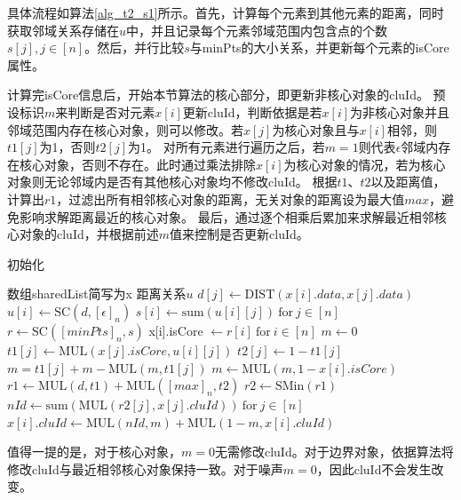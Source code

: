 具体流程如算法\ref{alg_t2_s1}所示。首先，计算每个元素到其他元素的距离，同时获取邻域关系存储在$ u $中，并且记录每个元素邻域范围内包含点的个数$ s[j],j\in[n] $。然后，并行比较$ s $与minPts的大小关系，并更新每个元素的isCore属性。

计算完isCore信息后，开始本节算法的核心部分，即更新非核心对象的cluId。
预设标识$ m $来判断是否对元素$ x[i] $更新cluId，判断依据是若$ x[i] $为非核心对象并且邻域范围内存在核心对象，则可以修改。若$ x[j] $为核心对象且与$ x[i] $相邻，则$ t1[j] $为1，否则$ t2[j] $为1。
对所有元素进行遍历之后，若$ m=1 $则代表$ \epsilon $邻域内存在核心对象，否则不存在。此时通过乘法排除$ x[i] $为核心对象的情况，若为核心对象则无论邻域内是否有其他核心对象均不修改cluId。
根据$ t1 $、$ t2 $以及距离值，计算出$ r1 $，过滤出所有相邻核心对象的距离，无关对象的距离设为最大值$ max $，避免影响求解距离最近的核心对象。
最后，通过逐个相乘后累加来求解最近相邻核心对象的cluId，并根据前述$ m $值来控制是否更新cluId。

\begin{algorithm}[htbp]
	\renewcommand{\algorithmicrequire}{\textbf{输入:}}
	\renewcommand{\algorithmicensure}{\textbf{输出:}}
	\caption{初始化}
	\label{alg_t2_s1}
	\begin{algorithmic}[1]
		\REQUIRE 数组sharedList简写为x
		\ENSURE 距离关系$ u $
		\STATE $ d[j] \leftarrow \text{DIST}(x[i].data, x[j].data) $
		\ENDFOR
		\STATE $ u[i] \leftarrow \text{SC}(d,[\epsilon]_n) $
		\STATE $ s[i] \leftarrow \text{sum}(u[i][j])\ \text{for}\ j\in[n]$
		\ENDFOR
		\STATE $ r \leftarrow \text{SC}([minPts]_n,s) $
		\STATE x[i].isCore $\leftarrow r[i]\ \text{for}\ i\in[n] $
		\STATE $ m \leftarrow 0 $
		\STATE $ t1[j] \leftarrow \text{MUL}(x[j].isCore, u[i][j]) $
		\STATE $ t2[j] \leftarrow 1-t1[j] $
		\STATE $ m = t1[j] + m - \text{MUL}(m, t1[j]) $
		\ENDFOR
		\STATE $ m \leftarrow \text{MUL}(m, 1-x[i].isCore) $
		\STATE $ r1 \leftarrow \text{MUL}(d, t1) + \text{MUL}([max]_n, t2) $
		\STATE $ r2 \leftarrow \text{SMin}(r1) $
		\STATE $ nId \leftarrow \text{sum}(\text{MUL}(r2[j], x[j].cluId))\ \text{for}\ j \in [n] $
		\STATE $ x[i].cluId \leftarrow \text{MUL}(nId, m) + \text{MUL}(1-m, x[i].cluId)$
		\ENDFOR
	\end{algorithmic}
\end{algorithm}

值得一提的是，对于核心对象，$ m = 0 $无需修改cluId。对于边界对象，依据算法将修改cluId与最近相邻核心对象保持一致。对于噪声$ m=0 $，因此cluId不会发生改变。

